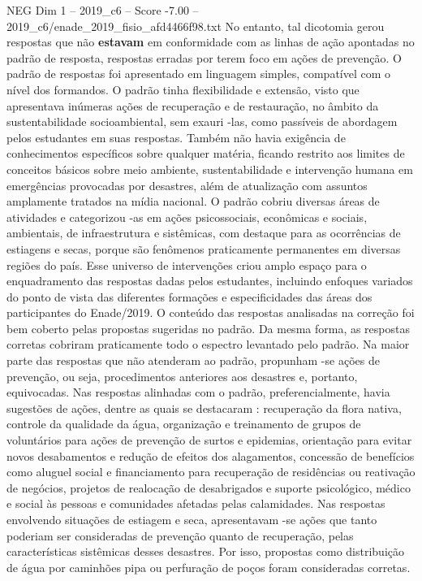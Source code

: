 \begin{textsample}{NEG Dim 1 – 2019\_c6 – Score -7.00 – 2019\_c6/enade\_2019\_fisio\_afd4466f98.txt}
No entanto, tal dicotomia gerou respostas que não \textbf{estavam} em conformidade com as linhas de ação apontadas no padrão de resposta, respostas erradas por terem foco em ações de prevenção.
O padrão de respostas foi apresentado em linguagem simples, compatível com o nível dos formandos.
O padrão tinha flexibilidade e extensão, visto que apresentava inúmeras ações de recuperação e de restauração, no âmbito da sustentabilidade socioambiental, sem exauri -las, como passíveis de abordagem pelos estudantes em suas respostas.
Também não havia exigência de conhecimentos específicos sobre qualquer matéria, ficando restrito aos limites de conceitos básicos sobre meio ambiente, sustentabilidade e intervenção humana em emergências provocadas por desastres, além de atualização com assuntos amplamente tratados na mídia nacional.
O padrão cobriu diversas áreas de atividades e categorizou -as em ações psicossociais, econômicas e sociais, ambientais, de infraestrutura e sistêmicas, com destaque para as ocorrências de estiagens e secas, porque são fenômenos praticamente permanentes em diversas regiões do país.
Esse universo de intervenções criou amplo espaço para o enquadramento das respostas dadas pelos estudantes, incluindo enfoques variados do ponto de vista das diferentes formações e especificidades das áreas dos participantes do Enade/2019.
O conteúdo das respostas analisadas na correção foi bem coberto pelas propostas sugeridas no padrão.
Da mesma forma, as respostas corretas cobriram praticamente todo o espectro levantado pelo padrão.
Na maior parte das respostas que não atenderam ao padrão, propunham -se ações de prevenção, ou seja, procedimentos anteriores aos desastres e, portanto, equivocadas.
Nas respostas alinhadas com o padrão, preferencialmente, havia sugestões de ações, dentre as quais se destacaram : recuperação da flora nativa, controle da qualidade da água, organização e treinamento de grupos de voluntários para ações de prevenção de surtos e epidemias, orientação para evitar novos desabamentos e redução de efeitos dos alagamentos, concessão de benefícios como aluguel social e financiamento para recuperação de residências ou reativação de negócios, projetos de realocação de desabrigados e suporte psicológico, médico e social às pessoas e comunidades afetadas pelas calamidades.
Nas respostas envolvendo situações de estiagem e seca, apresentavam -se ações que tanto poderiam ser consideradas de prevenção quanto de recuperação, pelas características sistêmicas desses desastres.
Por isso, propostas como distribuição de água por caminhões pipa ou perfuração de poços foram consideradas corretas.

\end{textsample}
